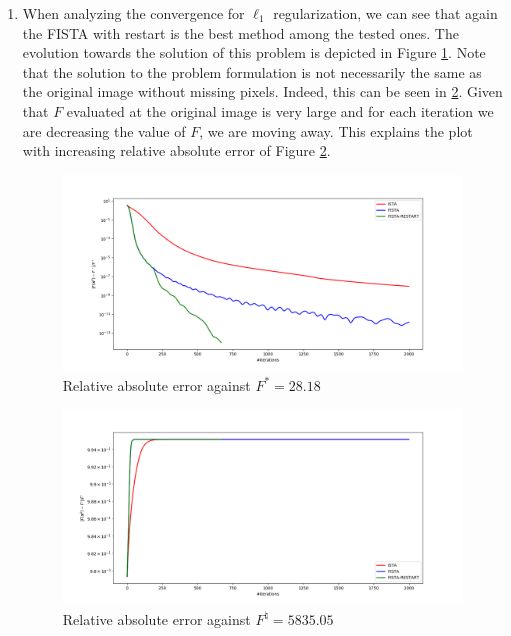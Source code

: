 \documentclass{article}
\begin{document}
\begin{enumerate}[label=2.\arabic*]
    
    \item When analyzing the convergence for $\ell_1$ regularization, we can see that again the FISTA with restart is the best method among the tested ones. The evolution towards the solution of this problem is depicted in Figure \ref{fig:f_star}. Note that the solution to the problem formulation is not necessarily the same as the original image without missing pixels. Indeed, this can be seen in \ref{fig:f_nat}. Given that $F$ evaluated at the original image is very large and for each iteration we are decreasing the value of $F$, we are moving away. This explains the plot with increasing relative absolute error of Figure \ref{fig:f_nat}.
    
    \begin{figure}[H]
        \centering
        \includegraphics[width=\textwidth]{img/against_f_star.png}
        \caption{Relative absolute error against $F^*=28.18$}
        \label{fig:f_star}
    \end{figure}
    
    \begin{figure}[H]
        \centering
        \includegraphics[width=\textwidth]{img/against_f_nat.png}
        \caption{Relative absolute error against $F^\natural = 5835.05$}
        \label{fig:f_nat}
    \end{figure}
    

\end{enumerate}
\end{document}
